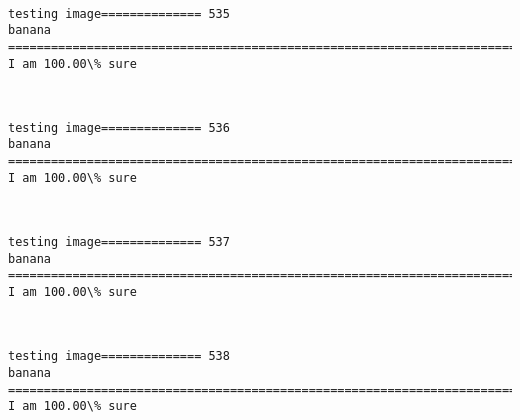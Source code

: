 \documentclass[11pt]{article}
\begin{document}
    \begin{center}
    \end{center}
    { \hspace*{\fill} \\}
    
    \begin{Verbatim}[commandchars=\\\{\}]
testing image============== 535
banana
============================================================================
I am 100.00\% sure

    \end{Verbatim}

    \begin{center}
    \end{center}
    { \hspace*{\fill} \\}
    
    \begin{Verbatim}[commandchars=\\\{\}]
testing image============== 536
banana
============================================================================
I am 100.00\% sure

    \end{Verbatim}

    \begin{center}
    \end{center}
    { \hspace*{\fill} \\}
    
    \begin{Verbatim}[commandchars=\\\{\}]
testing image============== 537
banana
============================================================================
I am 100.00\% sure

    \end{Verbatim}

    \begin{center}
    \end{center}
    { \hspace*{\fill} \\}
    
    \begin{Verbatim}[commandchars=\\\{\}]
testing image============== 538
banana
============================================================================
I am 100.00\% sure

    \end{Verbatim}
\end{document}
